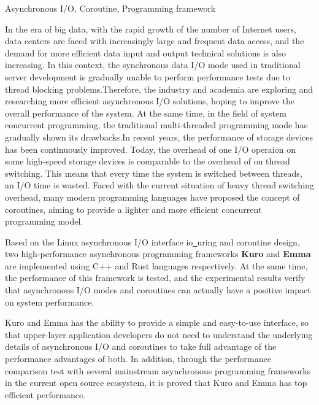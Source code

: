 \documentclass[supercite]{HustGraduPaper}
\theoremstyle{definition}
\begin{document}
\begin{enabstract}{Asynchronous I/O, Coroutine, Programming framework}

In the era of big data, with the rapid growth of the number of Internet users, data centers
are faced with increasingly large and frequent data access, and the demand for more efficient
data input and output technical solutions is also increasing. In this context, the synchronous
data I/O mode used in traditional server development is gradually unable to perform performance
tests due to thread blocking problems.Therefore, the industry and academia are exploring and
researching more efficient asynchronous I/O solutions, hoping to improve the overall performance
of the system.
At the same time, in the field of system concurrent programming, the traditional multi-threaded
programming mode has gradually shown its drawbacks.In recent years, the performance of storage
devices has been continuously improved. Today, the overhead of one I/O operaion on some high-speed
storage devices is comparable to the overhead of on thread switching. This means that every time
the system is switched between threads, an I/O time is wasted. Faced with the current situation
of heavy thread switching overhead, many modern programming languages have proposed the concept
of coroutines, aiming to provide a lighter and more efficient concurrent programming model.\par

Based on the Linux asynchronous I/O interface io\underline{~}uring and coroutine design,
two high-performance asynchronous programming frameworks \textbf{Kuro} and \textbf{Emma} are implemented using C++ and Rust languages respectively.
At the same time, the performance of this framework is tested,
and the experimental results verify that asynchronous I/O modes and coroutines can actually have a positive impact on system performance.\par

Kuro and Emma
has the ability to provide a simple and easy-to-use interface,
so that upper-layer application developers do not need to understand the underlying details of
asynchronous I/O and coroutines to take full advantage of the performance advantages of both.
In addition, through the performance comparison test with several mainstream asynchronous programming frameworks in the current open source ecosystem,
it is proved that Kuro and Emma has top efficient performance.\par


\end{enabstract}
\end{document}
